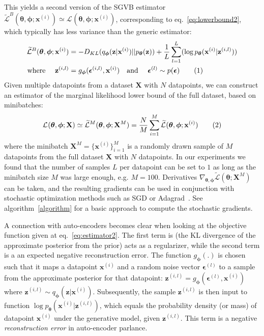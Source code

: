 \documentclass{article} %
\theoremstyle{definition}
\newcommand{\bb}[1]{\mathbf{#1}}
\newcommand{\bx}{\bb{x}}
\newcommand{\bxi}{\bx^{(i)}}
\newcommand{\bz}{\bb{z}}
\newcommand{\bzil}{\bz^{(i,l)}}
\newcommand{\bT}{\boldsymbol{\theta}}
\newcommand{\bphi}{\boldsymbol{\phi}}
\newcommand{\beps}{\boldsymbol{\epsilon}}
\newcommand{\bepsl}{\beps^{(l)}}
\newcommand{\bepsil}{\beps^{(i,l)}}
\newcommand{\bX}{\bb{X}}
\newcommand{\pT}{p_{\bT}}
\newcommand{\qPhi}{q_{\bphi}}
\newcommand{\gPhi}{g_{\bphi}}
\newcommand{\eqnr}{\addtocounter{equation}{1}\tag{\theequation}}
\theoremstyle{definition}
\newcommand{\LB}[2]{\mathcal{L}^{#1}(\bT,\bphi; #2)}
\newcommand{\LBT}[2]{\widetilde{\mathcal{L}}^{#1}(\bT,\bphi; #2)}
\begin{document}
This yields a second version of the SGVB estimator $\LBT{B}{\bxi} \simeq \LB{}{\bxi}$, corresponding to eq.~\eqref{eq:lowerbound2}, which typically has less variance than the generic estimator:
\begin{align*}
\LBT{B}{\bxi}
&= - D_{KL}(\qPhi(\bz|\bxi) || \pT(\bz))
+ \frac{1}{L} \sum_{l=1}^L (\log \pT(\bxi|\bzil)) \\
\text{where \quad} \bzil &= \gPhi(\bepsil,\bxi)
\text{\quad and \quad} \bepsl \sim p(\beps)
\eqnr\label{eq:estimator2}
\end{align*}
Given multiple datapoints from a dataset $\bX$ with $N$ datapoints, we can construct an estimator of the marginal likelihood lower bound of the full dataset, based on minibatches:
\begin{align*}
\LB{}{\bX} \simeq \LBT{M}{\bX^M} = \frac{N}{M} \sum_{i=1}^M \LBT{}{\bxi}
\eqnr\label{eq:minibatchestimator}\end{align*}
where the minibatch $\bX^M = \{\bxi\}_{i=1}^M$ is a randomly drawn sample of $M$ datapoints from the full dataset $\bX$ with $N$ datapoints. In our experiments we found that the number of samples $L$ per datapoint can be set to $1$ as long as the minibatch size $M$ was large enough, e.g. $M=100$. Derivatives $\nabla_{\bT,\bphi} \widetilde{\mathcal{L}}(\bT;\bX^M)$ can be taken, and the resulting gradients can be used in conjunction with stochastic optimization methods such as SGD or Adagrad~\cite{duchi2010adaptive}. See algorithm~\ref{algorithm} for a basic approach to compute the stochastic gradients.

%
A connection with auto-encoders becomes clear when looking at the objective function given at eq.~\eqref{eq:estimator2}. The first term is (the KL divergence of the approximate posterior from the prior) acts as a regularizer, while the second term is a an expected negative reconstruction error. 
%
The function $\gPhi(.)$ is chosen such that it maps a datapoint $\bxi$ and a random noise vector $\bepsl$ to a sample from the approximate posterior for that datapoint: $\bzil = \gPhi(\bepsl, \bxi)$ where $\bzil \sim \qPhi(\bz|\bxi)$. 
Subsequently, the sample $\bzil$ is then input to function $\log \pT(\bxi|\bzil)$, which equals the probability density (or mass) of datapoint $\bxi$ under the generative model, given $\bzil$. This term is a negative \emph{reconstruction error} in auto-encoder parlance.
\end{document}
